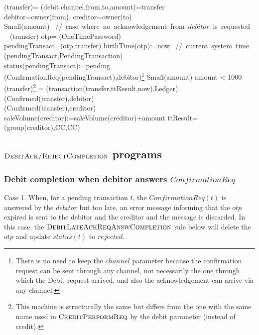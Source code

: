 \begin{asm}
(transfer)=\+
\LET (debit,channel,from,to,amount)=transfer \\
\LET debitor=owner(from), creditor=owner(to)\\
\IF Small(amount) 
\mbox{  // case where no acknowledgement from $debitor$ is requested}\+
   \THEN ~ (transfer) \-
   \ELSE \+
       \LET otp= \NEW(OneTimePassword)\\
       \LET pendingTransact=(otp,transfer)\+
          birthTime(otp):=now \mbox{ // current system time}\\
          (pendingTransact,PendingTransaction)\\ 
          status(pendingTransact):=pending \\
          (ConfirmationReq(pendingTransact),\TO debitor)\footnote{There is no need to keep the $channel$ parameter because the confirmation request can be sent through any channel, not necessarily the one through which the Debit request arrived, and also the acknowledgement can arrive via any channel.}
       \dec\-
\WHERE \+
Small(amount) \IFF amount < 1000 \\
 (transfer)\footnote{This machine is structurally the same but differs from the one with the same name used in $\hbox{\sc CreditPerformReq}$ by the debit parameter (instead of credit).} =\+     
   (transaction(transfer,ttResult,now),Ledger)\\
   (Confirmed(transfer),\TO debitor)\\
   (Confirmed(transfer),\TO creditor)\\
   saleVolume(creditor):=saleVolume(creditor)+amount \-
ttResult=(group(creditor),CC,CC)
\end{asm}


\subsection{ $\hbox{\sc DebitAck/RejectCompletion}$ programs}
\label{sect:debitackreject}

\subsubsection{Debit completion when debitor answers $ConfirmationReq$}\label{sect:debitack}

Case 1. When, for a pending transaction $t$, the $ConfirmationReq(t)$ is answered by the $debitor$ but too late, an error message informing that the $otp$ expired is sent to the debitor and the creditor and the message is discarded. In this case, the $\hbox{\sc DebitLateAckReqAnswCompletion}$ rule below will delete the $otp$ and update $status(t)$ to $rejected$.

